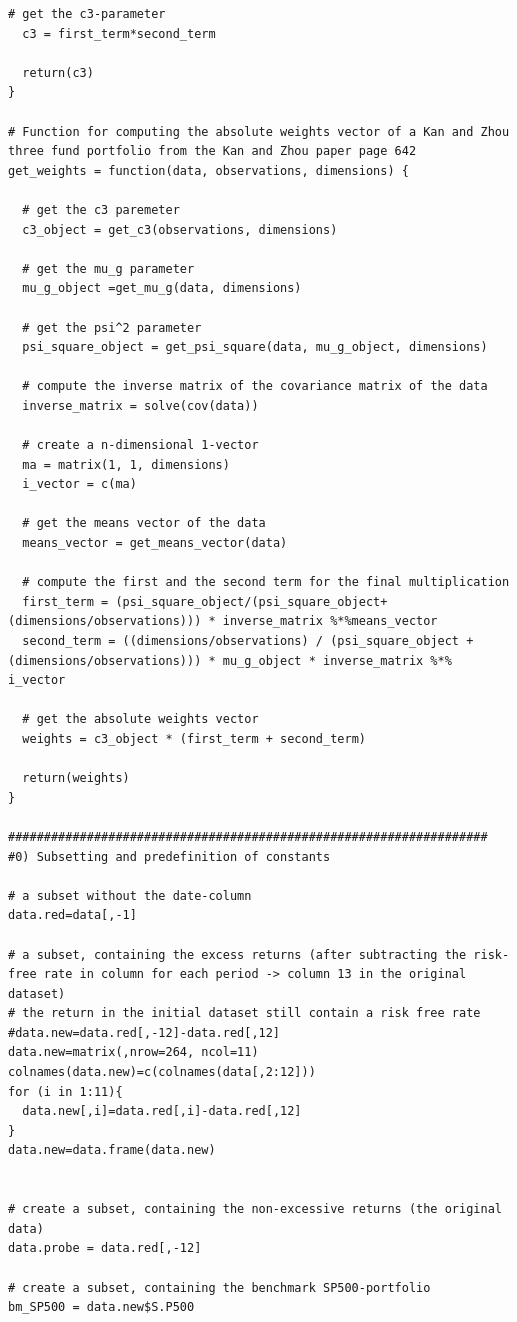 \documentclass{article}
\begin{document}
\begin{lstlisting}[caption={This listing shows the entire code developed in R.}, label=code:1,frame=single]
  # get the c3-parameter
  c3 = first_term*second_term
  
  return(c3)
}

# Function for computing the absolute weights vector of a Kan and Zhou three fund portfolio from the Kan and Zhou paper page 642
get_weights = function(data, observations, dimensions) {
  
  # get the c3 paremeter
  c3_object = get_c3(observations, dimensions)
  
  # get the mu_g parameter
  mu_g_object =get_mu_g(data, dimensions)
  
  # get the psi^2 parameter
  psi_square_object = get_psi_square(data, mu_g_object, dimensions)
  
  # compute the inverse matrix of the covariance matrix of the data
  inverse_matrix = solve(cov(data))
  
  # create a n-dimensional 1-vector
  ma = matrix(1, 1, dimensions) 
  i_vector = c(ma)
  
  # get the means vector of the data
  means_vector = get_means_vector(data)
  
  # compute the first and the second term for the final multiplication
  first_term = (psi_square_object/(psi_square_object+(dimensions/observations))) * inverse_matrix %*%means_vector
  second_term = ((dimensions/observations) / (psi_square_object + (dimensions/observations))) * mu_g_object * inverse_matrix %*% i_vector
  
  # get the absolute weights vector
  weights = c3_object * (first_term + second_term)
  
  return(weights)
}

###################################################################
#0) Subsetting and predefinition of constants

# a subset without the date-column
data.red=data[,-1]

# a subset, containing the excess returns (after subtracting the risk-free rate in column for each period -> column 13 in the original dataset)
# the return in the initial dataset still contain a risk free rate 
#data.new=data.red[,-12]-data.red[,12]
data.new=matrix(,nrow=264, ncol=11)
colnames(data.new)=c(colnames(data[,2:12]))
for (i in 1:11){
  data.new[,i]=data.red[,i]-data.red[,12]
}
data.new=data.frame(data.new)


# create a subset, containing the non-excessive returns (the original data)
data.probe = data.red[,-12]

# create a subset, containing the benchmark SP500-portfolio
bm_SP500 = data.new$S.P500


\end{lstlisting}
\end{document}
